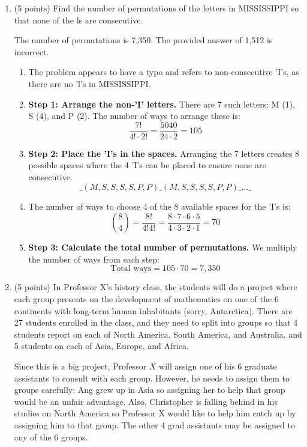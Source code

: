 \documentclass{article}
\begin{document}
\begin{enumerate}
  \item (5 points) Find the number of permutations of the letters in MISSISSIPPI so that none of the ls are consecutive.
  \begin{answer}
    The number of permutations is 7,350. The provided answer of 1,512 is incorrect.
    \begin{enumerate}
      \item The problem appears to have a typo and refers to non-consecutive 'I's, as there are no 'l's in MISSISSIPPI.
      \item \textbf{Step 1: Arrange the non-'I' letters.} There are 7 such letters: M (1), S (4), and P (2). The number of ways to arrange these is:
      $$
      \frac{7!}{4! \cdot 2!} = \frac{5040}{24 \cdot 2} = 105
      $$
      \item \textbf{Step 2: Place the 'I's in the spaces.} Arranging the 7 letters creates 8 possible spaces where the 4 'I's can be placed to ensure none are consecutive.
      $$
      \_ (M, S, S, S, S, P, P) \_ (M, S, S, S, S, P, P) \_ \dots \_
      $$
      \item The number of ways to choose 4 of the 8 available spaces for the 'I's is:
      $$
      \binom{8}{4} = \frac{8!}{4! 4!} = \frac{8 \cdot 7 \cdot 6 \cdot 5}{4 \cdot 3 \cdot 2 \cdot 1} = 70
      $$
      \item \textbf{Step 3: Calculate the total number of permutations.} We multiply the number of ways from each step:
      $$
      \text{Total ways} = 105 \cdot 70 = 7,350
      $$
    \end{enumerate}
  \end{answer}



  \newpage

  \item (5 points) In Professor X's history class, the students will do a project where each group presents on the development of mathematics on one of the 6 continents with long-term human inhabitants (sorry, Antarctica). There are 27 students enrolled in the class, and they need to split into groups so that 4 students report on each of North America, South America, and Australia, and 5 students on each of Asia, Europe, and Africa.

  Since this is a big project, Professor $X$ will assign one of his 6 graduate assistants to consult with each group. However, he needs to assign them to groups carefully: Ang grew up in Asia so assigning her to help that group would be an unfair advantage. Also, Christopher is falling behind in his studies on North America so Professor X would like to help him catch up by assigning him to that group. The other 4 grad assistants may be assigned to any of the 6 groups.


\end{enumerate}
\end{document}
